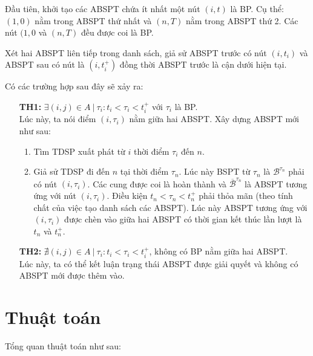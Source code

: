 \documentclass[../main.tex]{subfiles}
\begin{document}
Đầu tiên, khởi tạo các ABSPT chứa ít nhất một nút \((i, t)\) là BP. 
Cụ thể: \((1, 0)\) nằm trong ABSPT thứ nhất và \((n, T)\) nằm
trong ABSPT thứ 2. Các nút \((1, 0\) và \((n, T)\) đều được coi là BP.

Xét hai ABSPT liên tiếp trong danh sách, giả sử ABSPT trước có nút
\((i, t_i)\) và ABSPT sau có nút là \((i, t_i^+)\) đồng thời ABSPT trước
là cận dưới hiện tại.

Có các trường hợp sau đây sẽ xảy ra:

\begin{itemize}
\tightlist
\item[\textbf{TH1:}]
  \(\exists (i, j) \in A\ |\ \tau_i:t_i < \tau_i < t_i^+\) với
  \(\tau_i\) là BP. \\ 
  Lúc này, ta nói điểm \((i, \tau_i)\) nằm giữa hai ABSPT.
  Xây dựng ABSPT mới như sau:

  \begin{enumerate}
  \def\labelenumi{\arabic{enumi}.}
  \tightlist
  \item
    Tìm TDSP xuất phát từ \(i\) thời điểm \(\tau_i\) đến \(n\).
  \item
    Giả sử TDSP đi đến \(n\) tại thời điểm \(\tau_n\). Lúc này BSPT từ
    \(\tau_n\) là \(\mathcal B ^{\tau_n}\) phải có nút \((i, \tau_i)\). Các cung được coi là hoàn thành và \(\overline {\mathcal B} ^{\tau_n}\)
    là ABSPT tương ứng với nút \((i, \tau_i)\). Điều kiện \(t_n < \tau_n < t_n^+\) phải
    thỏa mãn (theo tính chất của việc tạo danh sách các ABSPT). 
    Lúc này ABSPT tương ứng với \((i, \tau_i)\) được chèn vào
    giữa hai ABSPT có thời gian kết thúc lần lượt là \(t_n\) và
    \(t_n^+\).
  \end{enumerate}
\item[\textbf{TH2:}]
  \(\nexists (i, j)\in A\ |\ \tau_i: t_i < \tau_i < t_i^+\), không có
  BP nằm giữa hai ABSPT. \\
  Lúc này, ta có thể kết luận trạng thái
  ABSPT được giải quyết và không có ABSPT mới được thêm vào. 
\end{itemize}

\section{Thuật toán}\label{thuux1eadt-touxe1n-1}

Tổng quan thuật toán như sau:
\end{document}
